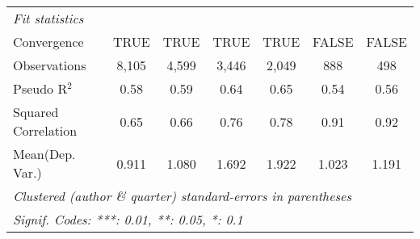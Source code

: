 \begin{tabular}{lcccccc}
   \midrule
   \emph{Fit statistics}\\
   Convergence                                                &TRUE           & TRUE          & TRUE         & TRUE        & FALSE   & FALSE\\  
   Observations                                               & 8,105         & 4,599         & 3,446        & 2,049       & 888     & 498\\  
   Pseudo R$^2$                                               & 0.58          & 0.59          & 0.64         & 0.65        & 0.54    & 0.56\\  
   Squared Correlation                                        & 0.65          & 0.66          & 0.76         & 0.78        & 0.91    & 0.92\\  
Mean(Dep. Var.) & 0.911 & 1.080 & 1.692 & 1.922 & 1.023 & 1.191 \\
   \midrule \midrule
   \multicolumn{7}{l}{\emph{Clustered (author \& quarter) standard-errors in parentheses}}\\
   \multicolumn{7}{l}{\emph{Signif. Codes: ***: 0.01, **: 0.05, *: 0.1}}\\
\end{tabular}
\par\endgroup
